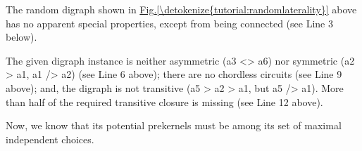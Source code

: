 \documentclass[a4paper,12pt,english]{sphinxhowto}
\begin{document}
The random digraph shown in \hyperref[\detokenize{tutorial:randomlaterality}]{Fig.\@ \ref{\detokenize{tutorial:randomlaterality}}} above has no apparent special properties, except from being connected (see Line 3 below).

\begin{sphinxVerbatim}[commandchars=\\\{\},numbers=left,firstnumber=1,stepnumber=1]
\end{sphinxVerbatim}

The given digraph instance is neither asymmetric (a3 \textless{}\textendash{}\textgreater{} a6) nor symmetric (a2 \textendash{}\textgreater{} a1, a1 \sphinxhyphen{}/\textgreater{} a2) (see Line 6 above); there are no chordless circuits (see Line 9 above); and, the digraph is not transitive (a5 \sphinxhyphen{}\textgreater{} a2 \sphinxhyphen{}\textgreater{} a1, but a5 \sphinxhyphen{}/\textgreater{} a1). More than half of the required transitive closure is missing (see Line 12 above).

Now, we know that its potential prekernels must be among its set of maximal independent choices.
\end{document}
